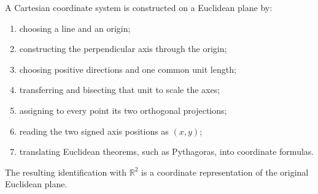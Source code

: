 \begin{summarybox}
A Cartesian coordinate system is constructed on a Euclidean plane by:
\begin{enumerate}
    \item choosing a line and an origin;
    \item constructing the perpendicular axis through the origin;
    \item choosing positive directions and one common unit length;
    \item transferring and bisecting that unit to scale the axes;
    \item assigning to every point its two orthogonal projections;
    \item reading the two signed axis positions as $(x,y)$;
    \item translating Euclidean theorems, such as Pythagoras, into coordinate
          formulas.
\end{enumerate}
The resulting identification with $\mathbb R^2$ is a coordinate representation
of the original Euclidean plane.
\end{summarybox}
